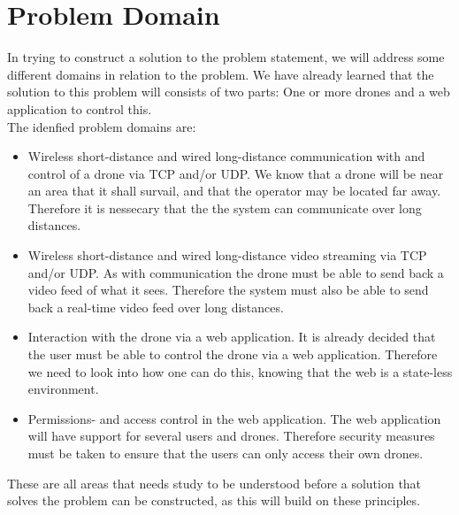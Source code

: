\section{Problem Domain}
In trying to construct a solution to the problem statement, we will address some different domains in relation to the problem. We have already learned that the solution to this problem will consists of two parts: One or more drones and a web application to control this. \\

The idenfied problem domains are:
\begin{itemize}
	\item Wireless short-distance and wired long-distance communication with and control of a drone via TCP and/or UDP. We know that a drone will be near an area that it shall survail, and that the operator may be located far away. Therefore it is nessecary that the the system can communicate over long distances. 
	\item Wireless short-distance and wired long-distance video streaming via TCP and/or UDP. As with communication the drone must be able to send back a video feed of what it sees. Therefore the system must also be able to send back a real-time video feed over long distances. 
	\item Interaction with the drone via a web application. It is already decided that the user must be able to control the drone via a web application. Therefore we need to look into how one can do this, knowing that the web is a state-less environment. 
	\item Permissions- and access control in the web application. The web application will have support for several users and drones. Therefore security measures must be taken to ensure that the users can only access their own drones.
\end{itemize}

These are all areas that needs study to be understood before a solution that solves the problem can be constructed, as this will build on these principles.
